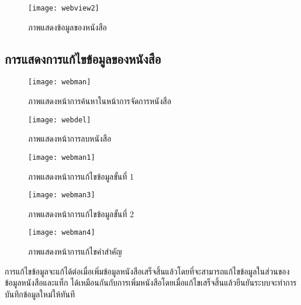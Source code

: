 \begin{figure}[H]
    \centering
    \texttt{[image: webview2]}
    \caption{ภาพแสดงข้อมูลของหนังสือ}\label{fig:webview2}
\end{figure}

\subsection{การแสดงการแก้ไขข้อมูลของหนังสือ}

\begin{figure}[H]
    \centering
    \texttt{[image: webman]}
    \caption{ภาพแสดงหน้าการค้นหาในหน้าการจัดการหนังสือ}\label{fig:webman}
\end{figure}

\begin{figure}[H]
    \centering
    \texttt{[image: webdel]}
    \caption{ภาพแสดงหน้าการลบหนังสือ}\label{fig:webdel}
\end{figure}

\begin{figure}[H]
    \centering
    \texttt{[image: webman1]}
    \caption{ภาพแสดงหน้าการแก้ไขข้อมูลขั้นที่ 1}\label{fig:webman1}
\end{figure}

\begin{figure}[H]
    \centering
    \texttt{[image: webman3]}
    \caption{ภาพแสดงหน้าการแก้ไขข้อมูลขั้นที่ 2}\label{fig:webman2}
\end{figure}

\begin{figure}[H]
    \centering
    \texttt{[image: webman4]}
    \caption{ภาพแสดงหน้าการแก้ไขคำสำคัญ}\label{fig:webman4}
\end{figure}

การแก้ไขข้อมูลจะแก้ได้ต่อเมื่อเพิ่มข้อมูลหนังสือเสร็จสิ้นแล้วโดยที่จะสามารถแก้ไขข้อมูลในส่วนของข้อมูลหนังสือและแท็ก ได้เหมือนกันกับการเพิ่มหนังสือโดยเมื่อแก้ไขเสร็จสิ้นแล้วยืนยันระบบจะทำการบันทึกข้อมูลใหม่ให้ทันที